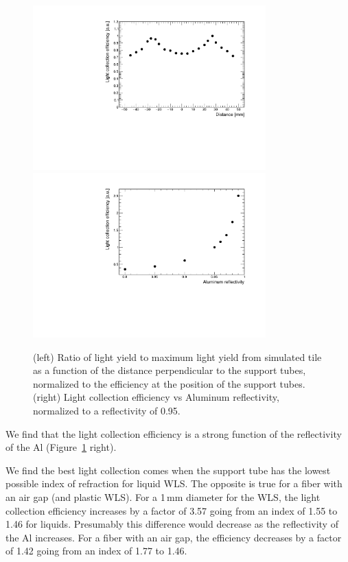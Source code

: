 \documentclass[review]{elsarticle}
\begin{document}
\begin{figure}[!ht]
\begin{center}
\includegraphics[width=0.8\textwidth]{./figures/geant_uniformity_plot.pdf}
\includegraphics[width=0.8\textwidth]{./figures/geant_reflectivity_plot.pdf}
\caption{(left) Ratio of light yield to maximum light yield from
  simulated tile as a function of the distance perpendicular to the
  support tubes, normalized to the efficiency at the position of the support tubes.
    (right) Light collection efficiency vs Aluminum
  reflectivity, normalized to a reflectivity of 0.95.
  }
\label{fig:simeff}
\end{center}
\end{figure}

We find that the light collection efficiency is a strong function of
the reflectivity of the Al (Figure~\ref{fig:simeff} right).

We find the best light collection comes when the support tube has the
lowest possible index of refraction for liquid WLS. The opposite is
true for a fiber with an air gap (and plastic WLS). For a 1\,mm
diameter for the WLS, the light collection efficiency increases by a
factor of 3.57 going from an
index of 1.55 to 1.46 for liquids. Presumably this difference would
decrease as the reflectivity of the Al increases. For a fiber with an
air gap, the efficiency decreases by a factor of 1.42 going from an index of 1.77 to 1.46.
\end{document}
